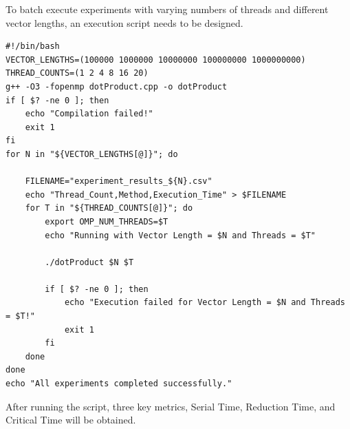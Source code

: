 \documentclass[unicode,11pt,a4paper,oneside,numbers=endperiod,openany]{scrartcl}
\begin{document}
To batch execute experiments with varying numbers of threads and different vector lengths, an execution script needs to be designed.

\begin{lstlisting}[language=MyBash, style=mystyle, caption={Bash Script for Dot Product Experiment}]
#!/bin/bash
VECTOR_LENGTHS=(100000 1000000 10000000 100000000 1000000000)
THREAD_COUNTS=(1 2 4 8 16 20)
g++ -O3 -fopenmp dotProduct.cpp -o dotProduct
if [ $? -ne 0 ]; then
    echo "Compilation failed!"
    exit 1
fi
for N in "${VECTOR_LENGTHS[@]}"; do
    
    FILENAME="experiment_results_${N}.csv"
    echo "Thread_Count,Method,Execution_Time" > $FILENAME
    for T in "${THREAD_COUNTS[@]}"; do
        export OMP_NUM_THREADS=$T
        echo "Running with Vector Length = $N and Threads = $T"

        ./dotProduct $N $T

        if [ $? -ne 0 ]; then
            echo "Execution failed for Vector Length = $N and Threads = $T!"
            exit 1
        fi
    done
done
echo "All experiments completed successfully."
\end{lstlisting}
After running the script, three key metrics, Serial Time, Reduction Time, and Critical Time will be obtained. 
\end{document}
